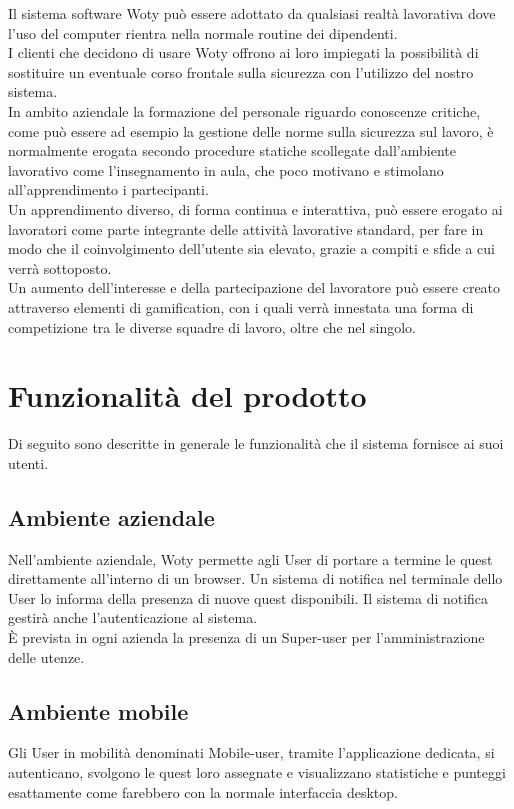Il sistema software Woty può essere adottato da qualsiasi realtà lavorativa dove l'uso del computer rientra nella normale routine dei dipendenti.\\
I clienti che decidono di usare Woty offrono ai loro impiegati la possibilità di sostituire un eventuale corso frontale sulla sicurezza con l'utilizzo del nostro sistema.\\
In ambito aziendale la formazione del personale riguardo conoscenze critiche, come può essere ad esempio la gestione delle norme sulla sicurezza sul lavoro, è normalmente erogata secondo procedure statiche scollegate dall'ambiente lavorativo come l'insegnamento in aula, che poco motivano e stimolano all'apprendimento i partecipanti.\\
Un apprendimento diverso, di forma continua e interattiva, può essere erogato ai lavoratori come parte integrante delle attività lavorative standard, per fare in modo che il coinvolgimento dell'utente sia elevato, grazie a compiti e sfide a cui verrà sottoposto.\\
Un aumento dell'interesse e della partecipazione del lavoratore può essere creato attraverso elementi di gamification, con i quali verrà innestata una forma di competizione tra le diverse squadre di lavoro, oltre che nel singolo.

\section{Funzionalità del prodotto}

Di seguito sono descritte in generale le funzionalità che il sistema fornisce ai suoi utenti.

\subsection{Ambiente aziendale}
Nell'ambiente aziendale, Woty permette agli User di portare a termine le quest direttamente all'interno di un browser. Un sistema di notifica nel terminale dello User lo informa della presenza di nuove quest disponibili. Il sistema di notifica gestirà anche l'autenticazione al sistema.\\ 
È prevista in ogni azienda la presenza di un Super-user per l'amministrazione delle utenze.


\subsection{Ambiente mobile}
Gli User in mobilità denominati Mobile-user, tramite l'applicazione dedicata, si autenticano, svolgono le quest loro assegnate e visualizzano statistiche e punteggi esattamente come farebbero con la normale interfaccia desktop.

